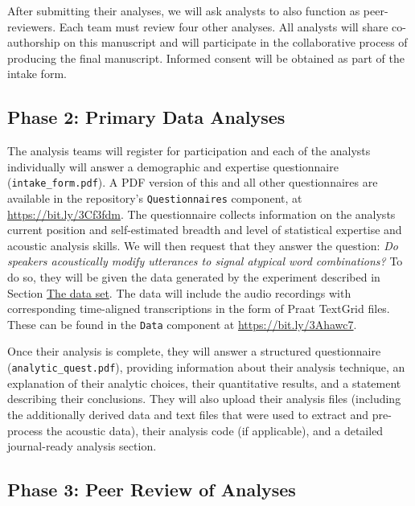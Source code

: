 \documentclass[Review,times,sageh]{sagej}
\begin{document}
After submitting their analyses, we will ask analysts to also function as peer-reviewers. Each team must review four other analyses.
All analysts will share co-authorship on this manuscript and will participate in the collaborative process of producing the final manuscript.
Informed consent will be obtained as part of the intake form.

\hypertarget{phase-2-primary-data-analyses}{%
\subsection{Phase 2: Primary Data Analyses}\label{phase-2-primary-data-analyses}}

The analysis teams will register for participation and each of the analysts individually will answer a demographic and expertise questionnaire (\texttt{intake\_form.pdf}).
A PDF version of this and all other questionnaires are available in the repository's \texttt{Questionnaires} component, at \url{https://bit.ly/3Cf3fdm}.
The questionnaire collects information on the analysts current position and self-estimated breadth and level of statistical expertise and acoustic analysis skills.
We will then request that they answer the question: \emph{Do speakers acoustically modify utterances to signal atypical word combinations?}
To do so, they will be given the data generated by the experiment described in Section \protect\hyperlink{s:dataset}{The data set}.
The data will include the audio recordings with corresponding time-aligned transcriptions in the form of Praat TextGrid files.
These can be found in the \texttt{Data} component at \url{https://bit.ly/3Ahawc7}.

Once their analysis is complete, they will answer a structured questionnaire (\texttt{analytic\_quest.pdf}), providing information about their analysis technique, an explanation of their analytic choices, their quantitative results, and a statement describing their conclusions.
They will also upload their analysis files (including the additionally derived data and text files that were used to extract and pre-process the acoustic data), their analysis code (if applicable), and a detailed journal-ready analysis section.

\hypertarget{phase-3-peer-review-of-analyses}{%
\subsection{Phase 3: Peer Review of Analyses}\label{phase-3-peer-review-of-analyses}}
\end{document}
